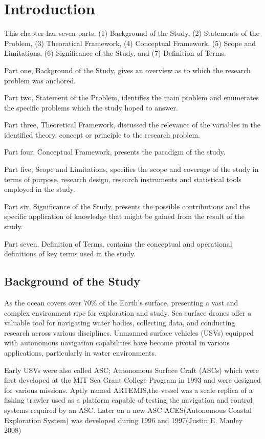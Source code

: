 \chapter{Introduction}

\vspace{-1cm}

 This chapter has seven parts: (1) Background of the Study, (2) Statements of the Problem, (3) Theoratical Framework, 
            (4) Conceptual Framework, (5) Scope and Limitations, (6) Significance of the Study, and (7) Definition of Terms.

 Part one, Background of the Study, gives an overview as to which the research problem was anchored.

 Part two, Statement of the Problem, identifies the main problem and enumerates the specific problems which the study hoped to answer.

 Part three, Theoretical Framework, discussed the relevance of the variables in the identified theory, concept or principle to 
            the research problem.

 Part four, Conceptual Framework, presents the paradigm of the study.

 Part five, Scope and Limitations, specifies the scope and coverage of the study in terms of purpose, research design, 
            research instruments and statistical tools employed in the study.

 Part six, Significance of the Study, presents the possible contributions and the specific application of knowledge that 
            might be gained from the result of the study.

 Part seven, Definition of Terms, contains the conceptual and operational definitions of key terms used in the study.

\section{Background of the Study}
 As the ocean covers over 70\% of the Earth's surface, presenting a vast and complex environment ripe for exploration and study. 
            Sea surface drones offer a valuable tool for navigating water bodies, collecting data, and conducting research across various disciplines. 
            Unmanned surface vehicles (USVs) equipped with autonomous navigation capabilities have become pivotal in various applications, particularly 
            in water environments.

 Early USVs were also called ASC; Autonomous Surface Craft (ASCs) which were first developed at the MIT Sea Grant College Program in 1993 and 
            were designed for various missions. Aptly named ARTEMIS,the vessel was a scale replica of a fishing trawler used as a platform capable of 
            testing the navigation and control systems required by an ASC. Later on a new ASC ACES(Autonomous Coastal Exploration System) was developed 
            during 1996 and 1997(Justin E. Manley 2008)

